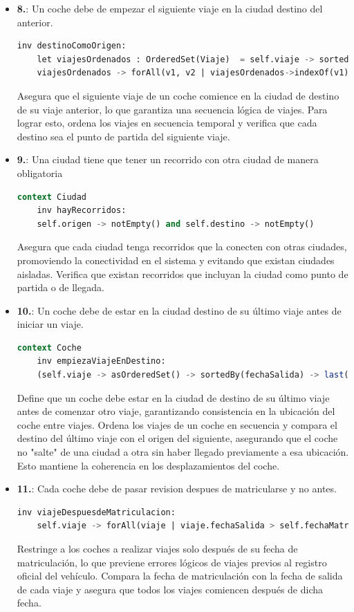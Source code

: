 \documentclass[12pt.a4paper]{article}
\begin{document}
\begin{itemize}
    \item \textbf{8.}: Un coche debe de empezar el siguiente viaje en la ciudad destino del anterior.
    \begin{lstlisting}[style = useEspecifico,language=SQL]
    inv destinoComoOrigen:
    let viajesOrdenados : OrderedSet(Viaje)  = self.viaje -> sortedBy(v | v.fechaSalida) in 
    viajesOrdenados -> forAll(v1, v2 | viajesOrdenados->indexOf(v1) = viajesOrdenados->indexOf(v2) + 1 implies v1.recorrido.destino = v2.recorrido.origen)
    \end{lstlisting}
    Asegura que el siguiente viaje de un coche comience en la ciudad de destino de su viaje anterior, lo que garantiza una secuencia lógica de viajes.
    Para lograr esto, ordena los viajes en secuencia temporal y verifica que cada destino sea el punto de partida del siguiente viaje.
    
    \item \textbf{9.}: Una ciudad tiene que tener un recorrido con otra ciudad de manera obligatoria
    \begin{lstlisting}[style = useEspecifico,language=SQL]
  context Ciudad
    inv hayRecorridos:
    self.origen -> notEmpty() and self.destino -> notEmpty()
    \end{lstlisting}
    Asegura que cada ciudad tenga recorridos que la conecten con otras ciudades, promoviendo la conectividad en el sistema y evitando que existan ciudades aisladas.
    Verifica que existan recorridos que incluyan la ciudad como punto de partida o de llegada.
    
    \item \textbf{10.}: Un coche debe de estar en la ciudad destino de su último viaje antes de iniciar un viaje.
    \begin{lstlisting}[style = useEspecifico,language=SQL]
  context Coche
    inv empiezaViajeEnDestino:
    (self.viaje -> asOrderedSet() -> sortedBy(fechaSalida) -> last()).recorrido.destino = self.ciudad
    \end{lstlisting}
     Define que un coche debe estar en la ciudad de destino de su último viaje antes de comenzar otro viaje, garantizando consistencia en la ubicación del coche entre viajes.
     Ordena los viajes de un coche en secuencia y compara el destino del último viaje con el origen del siguiente, asegurando que el coche no "salte" de una ciudad a otra sin haber llegado previamente a esa ubicación. Esto mantiene la coherencia en los desplazamientos del coche.
     
    \item \textbf{11.}: Cada coche debe de pasar revision despues de matricularse y no antes.
    \begin{lstlisting}[style = useEspecifico,language=SQL]
    inv viajeDespuesdeMatriculacion:
    self.viaje -> forAll(viaje | viaje.fechaSalida > self.fechaMatriculacion)    
    \end{lstlisting}
    Restringe a los coches a realizar viajes solo después de su fecha de matriculación, lo que previene errores lógicos de viajes previos al registro oficial del vehículo.
    Compara la fecha de matriculación con la fecha de salida de cada viaje y asegura que todos los viajes comiencen después de dicha fecha.
    

\end{itemize}
\end{document}

